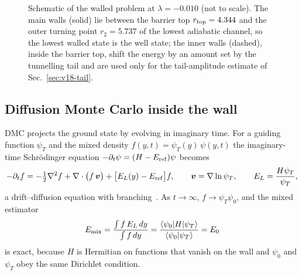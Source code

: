 \begin{figure}[t]
\centering
{}
\caption{Schematic of the walled problem at $\lambda=-0.010$ (not to scale). The main walls (solid) lie between the barrier top $r_{\rm top}=4.344$ and the outer turning point $r_2=5.737$ of the lowest adiabatic channel, so the lowest walled state is the well state; the inner walls (dashed), inside the barrier top, shift the energy by an amount set by the tunnelling tail and are used only for the tail-amplitude estimate of Sec.~\ref{sec:v18-tail}.}
\label{fig:v18-walls}
\end{figure}

\subsection{Diffusion Monte Carlo inside the wall}\label{sec:v18-dmc}

DMC projects the ground state by evolving in imaginary time.
For a guiding function $\psi_T$ and the mixed density $f(y,t)=\psi_T(y)\,\psi(y,t)$ the imaginary-time Schr\"odinger equation $-\partial_t\psi=(H-E_{\rm ref})\psi$ becomes
\begin{equation}
-\partial_t f=-\tfrac12\nabla^2f+\nabla\cdot\bigl(f\,\bm v\bigr)+\bigl[E_L(y)-E_{\rm ref}\bigr]f,
\qquad
\bm v=\nabla\ln\psi_T,\qquad E_L=\frac{H\psi_T}{\psi_T},
\label{eq:v18-fp}
\end{equation}
a drift--diffusion equation with branching~\cite{Foulkes:2001zz,Kosztin:1996fh}.
As $t\to\infty$, $f\to\psi_T\psi_0$, and the mixed estimator
\begin{equation}
E_{\rm mix}=\frac{\int f\,E_L\,dy}{\int f\,dy}=\frac{\langle\psi_0|H|\psi_T\rangle}{\langle\psi_0|\psi_T\rangle}=E_0
\label{eq:v18-mixed}
\end{equation}
is exact, because $H$ is Hermitian on functions that vanish on the wall and $\psi_0$ and $\psi_T$ obey the same Dirichlet condition.

